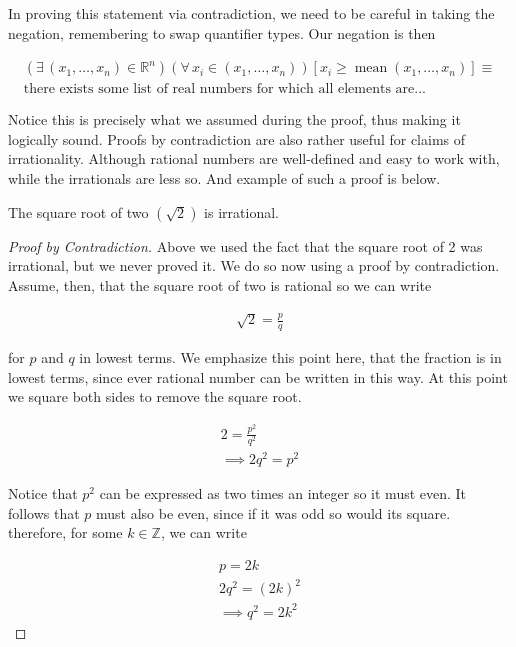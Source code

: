 \documentclass[twoside]{report}
\DeclareMathOperator{\mean}{mean}
\begin{document}
In proving this statement via contradiction, we need to be careful in taking the negation, remembering to swap quantifier types. Our negation is then

\begin{align*}
	(\exists \, (x_1, \dots, x_n) \in \mathbb{R}^n)(\forall \, x_i \in (x_1, \dots, x_n))[x_i \ge \mean(x_1, \dots, x_n)] \equiv \\
	\text{there exists some list of real numbers for which all elements are...}
\end{align*}

Notice this is precisely what we assumed during the proof, thus making it logically sound. Proofs by contradiction are also rather useful for claims of irrationality. Although rational numbers are well-defined and easy to work with, while the irrationals are less so. And example of such a proof is below.

\vspace{\baselineskip}
\begin{theorem}
	The square root of two $(\sqrt{2})$ is irrational.
\end{theorem}

\begin{proof}[Proof by Contradiction]
	Above we used the fact that the square root of 2 was irrational, but we never proved it. We do so now using a proof by contradiction. Assume, then, that the square root of two is rational so we can write
	
	\begin{align*}
		\sqrt{2} = \frac{p}{q}
	\end{align*}
	
	for $p$ and $q$ in lowest terms. We emphasize this point here, that the fraction is in lowest terms, since ever rational number can be written in this way. At this point we square both sides to remove the square root.
	
	\begin{align*}
		2 = \frac{p^2}{q^2} \\
		\implies 2 q^2 = p^2
	\end{align*}
	
	Notice that $p^2$ can be expressed as two times an integer so it must even. It follows that $p$ must also be even, since if it was odd so would its square. therefore, for some $k \in \mathbb{Z}$, we can write
	
	\begin{align*}
		p = 2k \\
		2 q^2 = (2k)^2 \\
		\implies q^2 = 2k^2
	\end{align*}
\end{proof}
\end{document}
